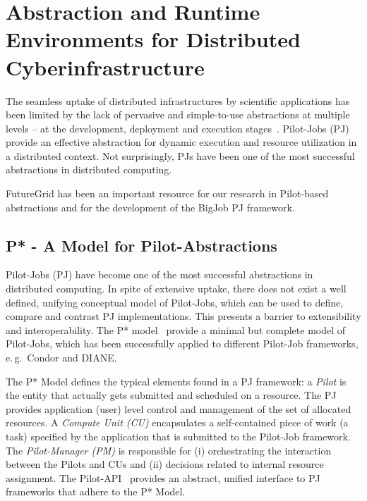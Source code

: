 \documentclass[]{paper}
\newcommand{\jhanote}[1]{ {\textcolor{red} { ***shantenu: #1 }}}
\newcommand{\jhanote}[1]{}
\begin{document}
% 



\section{Abstraction and Runtime Environments for Distributed Cyberinfrastructure}

The seamless uptake of distributed infrastructures by scientific applications
has been limited by the lack of pervasive and simple-to-use abstractions at
multiple levels -- at the development, deployment and execution
stages~\cite{dpagrid2009}. Pilot-Jobs (PJ) provide an effective abstraction for
dynamic execution and resource utilization in a distributed context. Not
surprisingly, PJs have been one of the most successful abstractions in
distributed computing. 

FutureGrid has been an important resource for our research in
Pilot-based abstractions and for the development of the BigJob PJ
framework\cite{saga_bigjob_condor_cloud}.

\subsection{P* - A Model for Pilot-Abstractions}

Pilot-Jobs (PJ) have become one of the most successful abstractions in
distributed computing. In spite of extensive uptake, there does not
exist a well defined, unifying conceptual model of Pilot-Jobs, which
can be used to define, compare and contrast PJ implementations. This
presents a barrier to extensibility and interoperability. The P*
model~\cite{pstar-2012,pstar-sc-2012} provide a minimal but complete
model of Pilot-Jobs, which has been successfully applied to different
Pilot-Job frameworks, e.\,g.\ Condor and DIANE.

The P* Model defines the typical elements found in a PJ framework: a
\emph{Pilot} is the entity that actually gets submitted and scheduled on a
resource. The PJ provides application (user) level control and management of
the set of allocated resources. A \emph{Compute Unit (CU)} encapsulates a
self-contained piece of work (a task) specified by the application that is
submitted to the Pilot-Job framework. The \emph{Pilot-Manager (PM)} is
responsible for (i) orchestrating the interaction between the Pilots and CUs
and (ii) decisions related to internal resource assignment. The 
Pilot-API~\cite{pilot_api} provides an abstract, unified interface to PJ
frameworks that adhere to the P* Model.
\end{document}
